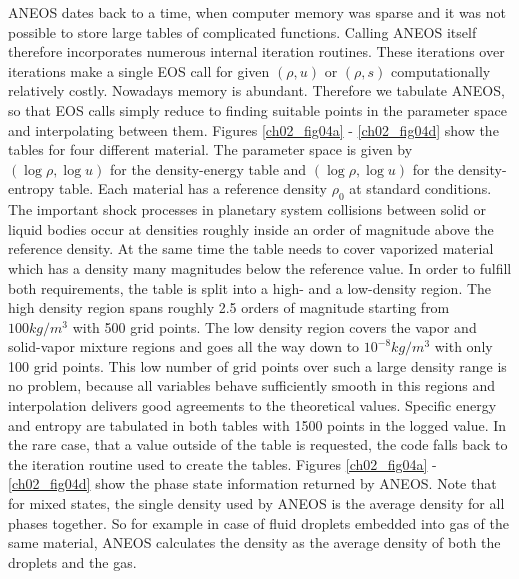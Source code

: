 ANEOS dates back to a time, when computer memory was sparse and it was not possible to store large tables of complicated functions. Calling ANEOS itself therefore incorporates numerous internal iteration routines. These iterations over iterations make a single EOS call for given $(\rho, u)$ or $(\rho, s)$ computationally relatively costly. Nowadays memory is abundant. Therefore we tabulate ANEOS, so that EOS calls simply reduce to finding suitable points in the parameter space and interpolating between them. Figures \ref{ch02_fig04a} - \ref{ch02_fig04d} show the tables for four different material. The parameter space is given by $(\log \rho, \log u)$ for the density-energy table and $(\log \rho, \log u)$ for the density-entropy table. Each material has a reference density $\rho_0$ at standard conditions. The important shock processes in planetary system collisions between solid or liquid bodies occur at densities roughly inside an order of magnitude above the reference density. At the same time the table needs to cover vaporized material which has a density many magnitudes below the reference value. In order to fulfill both requirements, the table is split into a high- and a low-density region. The high density region spans roughly 2.5 orders of magnitude starting from $100kg/m^3$ with 500 grid points. The low density  region covers the vapor and solid-vapor mixture regions and goes all the way down to $10^{-8}kg/m^3$ with only 100 grid points. This low number of grid points over such a large density range is no problem, because all variables behave sufficiently smooth in this regions and interpolation delivers good agreements to the theoretical values. Specific energy and entropy are tabulated in both tables with 1500 points in the logged value. In the rare case, that a value outside of the table is requested, the code falls back to the iteration routine used to create the tables. Figures \ref{ch02_fig04a} - \ref{ch02_fig04d} show the phase state information returned by ANEOS. Note that for mixed states, the single density used by ANEOS is the average density for all phases together. So for example in case of fluid droplets embedded into gas of the same material, ANEOS calculates the density as the average density of both the droplets and the gas.

